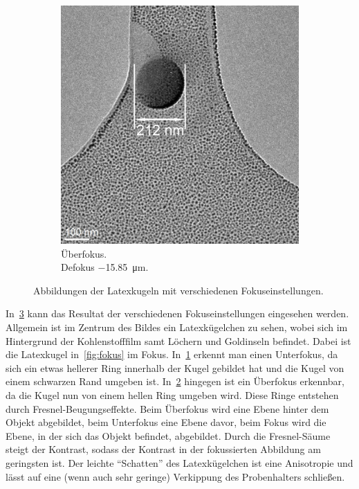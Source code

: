 \documentclass[slug=TEM, room=IFW, supervisor=?, coursedate=23.\ 01.\ 2020]{../../Lab_Report_LaTeX/lab_report}
\begin{document}
\begin{figure}[h]
\begin{subfigure}{.29\textwidth}
    \label{fig:unterfok}
  \end{subfigure}
  \begin{subfigure}{.29\textwidth}
    \includegraphics[width=.8\textwidth]{../messungen/Fokus_Latex/auswertung/Fokus-20m.jpg}
    \caption{Überfokus.\\ Defokus \SI{-15.85}{\micro\meter}.}
    \label{fig:uberfok}
  \end{subfigure}
  \caption{Abbildungen der Latexkugeln mit verschiedenen
    Fokuseinstellungen.}
  \label{fig:latex}
\end{figure}

In~\ref{fig:latex} kann das Resultat der verschiedenen
Fokuseinstellungen eingesehen werden.  Allgemein ist im Zentrum des
Bildes ein Latexk\"ugelchen zu sehen, wobei sich im Hintergrund der
Kohlenstofffilm samt L\"ochern und Goldinseln befindet. Dabei ist die
Latexkugel in~\ref{fig:fokus} im Fokus.  In~\ref{fig:unterfok} erkennt
man einen Unterfokus, da sich ein etwas hellerer Ring innerhalb der
Kugel gebildet hat und die Kugel von einem schwarzen Rand umgeben
ist. In~\ref{fig:uberfok} hingegen ist ein Überfokus erkennbar, da die
Kugel nun von einem hellen Ring umgeben wird. Diese Ringe entstehen
durch Fresnel-Beugungseffekte. Beim Überfokus wird eine Ebene hinter
dem Objekt abgebildet, beim Unterfokus eine Ebene davor, beim Fokus
wird die Ebene, in der sich das Objekt befindet, abgebildet.  Durch
die Fresnel-S\"aume steigt der Kontrast, sodass der Kontrast in der
fokussierten Abbildung am geringsten ist. Der leichte ``Schatten'' des
Latexk\"ugelchen ist eine Anisotropie und l\"asst auf eine (wenn auch
sehr geringe) Verkippung des Probenhalters schließen.
\end{document}
